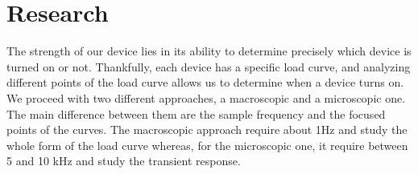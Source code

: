 %
%
\section{Research}

The strength of our device lies in its ability to determine precisely which device is turned on or not. Thankfully, each device has a specific load curve, and analyzing different points of the load curve allows us to determine when a device turns on. We proceed with two different approaches, a macroscopic and a microscopic one. The main difference between them are the sample frequency and the focused points of the curves. The macroscopic approach require about 1Hz and study the whole form of the load curve whereas, for the microscopic one, it require between 5 and 10 kHz and study the transient response.




